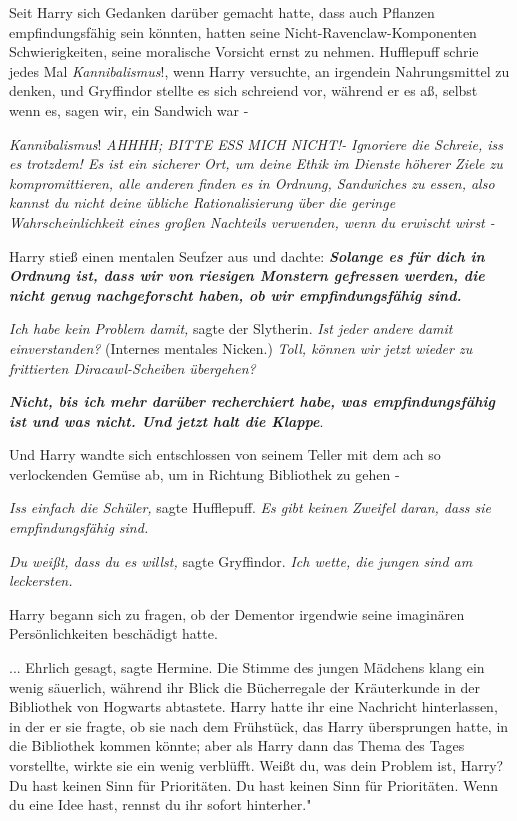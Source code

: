 Seit Harry sich Gedanken darüber gemacht hatte, dass auch Pflanzen
empfindungsfähig sein könnten, hatten seine Nicht-Ravenclaw-Komponenten
Schwierigkeiten, seine moralische Vorsicht ernst zu nehmen. Hufflepuff schrie
jedes Mal \glqq \emph{Kannibalismus}!\grqq{}, wenn Harry versuchte, an irgendein
Nahrungsmittel zu denken, und Gryffindor stellte es sich schreiend vor, während
er es aß, selbst wenn es, sagen wir, ein Sandwich war -

\emph{Kannibalismus}!
\emph{AHHHH; BITTE ESS MICH NICHT!- }
\emph{Ignoriere die Schreie, iss es trotzdem! Es ist ein sicherer Ort, um deine Ethik im Dienste höherer Ziele zu kompromittieren, alle anderen finden es in Ordnung, Sandwiches zu essen, also kannst du nicht deine übliche Rationalisierung über die geringe Wahrscheinlichkeit eines großen Nachteils verwenden, wenn du erwischt wirst - }

Harry stieß einen mentalen Seufzer aus und dachte: \textbf{\emph{Solange es für
dich in Ordnung ist, dass wir von riesigen Monstern gefressen werden, die nicht
genug nachgeforscht haben, ob wir empfindungsfähig sind. }}

\emph{Ich habe kein Problem damit,} sagte der Slytherin. \emph{Ist jeder andere
damit einverstanden?} (Internes mentales Nicken.) \emph{Toll, können wir jetzt
wieder zu frittierten Diracawl-Scheiben übergehen? }

\textbf{\emph{Nicht, bis ich mehr darüber recherchiert habe, was
empfindungsfähig ist und was nicht. Und jetzt halt die Klappe}}.

Und Harry wandte sich entschlossen von seinem Teller mit dem ach so verlockenden
Gemüse ab, um in Richtung Bibliothek zu gehen -

\emph{Iss einfach die Schüler,} sagte Hufflepuff.
\emph{Es gibt keinen Zweifel daran, dass sie empfindungsfähig sind. }

\emph{Du weißt, dass du es willst, }sagte Gryffindor.
\emph{Ich wette, die jungen sind am leckersten.}

Harry begann sich zu fragen, ob der Dementor irgendwie seine imaginären
Persönlichkeiten beschädigt hatte.

... \glqq Ehrlich gesagt\grqq{}, sagte Hermine. Die Stimme des jungen Mädchens
klang ein wenig säuerlich, während ihr Blick die Bücherregale der Kräuterkunde
in der Bibliothek von Hogwarts abtastete. Harry hatte ihr eine Nachricht
hinterlassen, in der er sie fragte, ob sie nach dem Frühstück, das Harry
übersprungen hatte, in die Bibliothek kommen könnte; aber als Harry dann das
Thema des Tages vorstellte, wirkte sie ein wenig verblüfft. \glqq Weißt du, was
dein Problem ist, Harry? Du hast keinen Sinn für Prioritäten. Du hast keinen
Sinn für Prioritäten. Wenn du eine Idee hast, rennst du ihr sofort hinterher."


